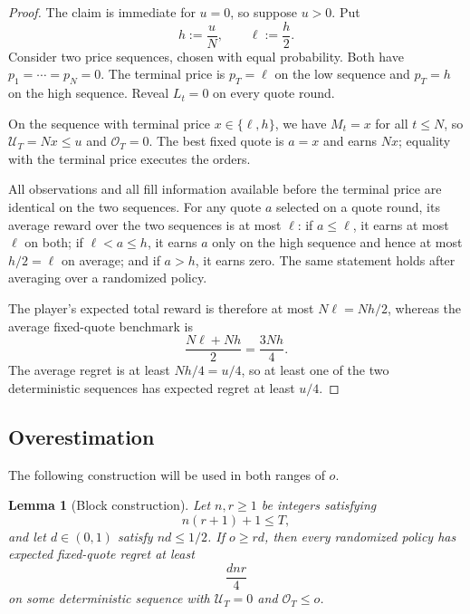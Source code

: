 \documentclass[11pt]{article}
\newtheorem{lemma}[theorem]{Lemma}
\theoremstyle{remark}
\newcommand{\cU}{\mathcal U}
\newcommand{\cO}{\mathcal O}
\begin{document}
\begin{proof}
The claim is immediate for $u=0$, so suppose $u>0$.  Put
\[
  h:=\frac uN,
  \qquad
  \ell:=\frac h2.
\]
Consider two price sequences, chosen with equal probability.  Both have
$p_1=\cdots=p_N=0$.  The terminal price is $p_T=\ell$ on the low sequence
and $p_T=h$ on the high sequence.  Reveal $L_t=0$ on every quote round.

On the sequence with terminal price $x\in\{\ell,h\}$, we have $M_t=x$ for
all $t\le N$, so $\cU_T=Nx\le u$ and $\cO_T=0$.  The best fixed quote is
$a=x$ and earns $Nx$; equality with the terminal price executes the orders.

All observations and all fill information available before the terminal
price are identical on the two sequences.  For any quote $a$ selected on a
quote round, its average reward over the two sequences is at most
$\ell$: if $a\le\ell$, it earns at most $\ell$ on both; if
$\ell<a\le h$, it earns $a$ only on the high sequence and hence at most
$h/2=\ell$ on average; and if $a>h$, it earns zero.  The same statement holds
after averaging over a randomized policy.

The player's expected total reward is therefore at most $N\ell=Nh/2$,
whereas the average fixed-quote benchmark is
\[
  \frac{N\ell+Nh}{2}=\frac{3Nh}{4}.
\]
The average regret is at least $Nh/4=u/4$, so at least one of the two
deterministic sequences has expected regret at least $u/4$.
\end{proof}

\subsection{Overestimation}

The following construction will be used in both ranges of $o$.

\newpage
\begin{lemma}[Block construction]\label{lem:block}
Let $n,r\ge1$ be integers satisfying
\[
  n(r+1)+1\le T,
\]
and let $d\in(0,1)$ satisfy $nd\le1/2$.  If $o\ge rd$, then every randomized
policy has expected fixed-quote regret at least
\begin{equation}\label{eq:block-result}
  \frac{dnr}{4}
\end{equation}
on some deterministic sequence with $\cU_T=0$ and $\cO_T\le o$.
\end{lemma}
\end{document}
